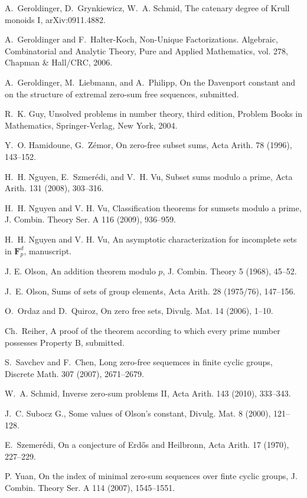 \documentclass{amsart}
\theoremstyle{definition}
\numberwithin{equation}{section}
\begin{document}
\begin{thebibliography}{99}
A.~Geroldinger, D.~Grynkiewicz, W.~A. Schmid, The catenary degree of Krull monoids {I}, arXiv:0911.4882.

A.~Geroldinger and F.~Halter-Koch, Non-{U}nique {F}actorizations. {A}lgebraic,
{C}ombinatorial and {A}nalytic {T}heory, Pure and Applied Mathematics, vol. 278, Chapman \& Hall/CRC, 2006.

 A.~Geroldinger, M.~Liebmann, and A.~Philipp, On the Davenport constant and on the structure of extremal zero-sum free sequences, submitted.

 R.~K. Guy, Unsolved problems in number theory, third edition, Problem Books in Mathematics, Springer-Verlag, New York, 2004.

 Y.~O. Hamidoune, G.~Z\'emor, On zero-free subset sums, Acta Arith. 78 (1996), 143--152.

 H.~H. Nguyen, E.~Szmer\'edi, and V.~H. Vu, Subset
sums modulo a prime, Acta Arith. 131 (2008), 303--316.

 H.~H. Nguyen and V. H. Vu, Classification theorems for sumsets modulo a prime, J. Combin. Theory Ser. A 116 (2009), 936--959.

 H.~H. Nguyen and V. H. Vu, An asymptotic characterization for incomplete sets in $\mathbf{F}_p^d$, manuscript.

 J. E. Olson, An addition theorem modulo $p$,
J. Combin. Theory 5 (1968), 45--52.

 J.~E. Olson, Sums of sets of group elements,
Acta Arith. 28 (1975/76), 147--156.

 O.~Ordaz and D.~Quiroz, On zero free sets,
Divulg. Mat.  14 (2006), 1--10.

Ch.~Reiher, A proof of the theorem according to which every prime number possesses {P}roperty B, submitted.

 S.~Savchev and F.~Chen, Long zero-free sequemces in
finite cyclic groups, Discrete Math. 307 (2007), 2671--2679.

W.~A. Schmid, Inverse zero-sum problems {II}, Acta Arith. 143 (2010), 333--343.

 J.~C. Subocz G., Some values of Olson's constant,
Divulg. Mat. 8 (2000), 121--128.

 E.~Szemer{\'e}di, On a conjecture of Erd{\H o}s and Heilbronn, Acta Arith. 17 (1970), 227--229.

 P. Yuan, On the index of minimal zero-sum sequences over finte cyclic groups, J. Combin. Theory Ser. A 114 (2007), 1545--1551.

\end{thebibliography}

 
\end{document}
